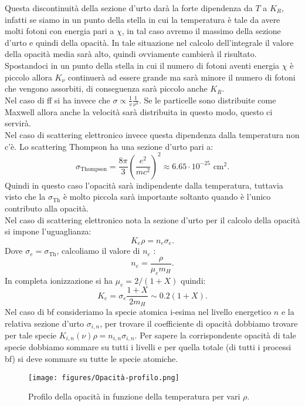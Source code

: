 Questa discontinuità della sezione d'urto darà la forte dipendenza da $T$ a $K_R$, infatti se siamo in un punto della stella in cui la temperatura è tale da avere molti fotoni con energia pari a $\chi$, in tal caso avremo il massimo della sezione d'urto e quindi della opacità. In tale situazione nel calcolo dell'integrale il valore della opacità media sarà alto, quindi ovviamente cambierà il risultato. \\
Spostandoci in un punto della stella in cui il numero di fotoni aventi energia $\chi$ è piccolo allora $K_\nu$ continuerà ad essere grande ma sarà minore il numero di fotoni che vengono assorbiti, di conseguenza sarà piccolo anche $K_R$.\\
Nel caso di ff si ha invece che $\sigma  \propto \frac{1}{\overline{v}} \frac{1}{\nu^3}$. Se le particelle sono distribuite come Maxwell allora anche la velocità sarà distribuita in questo modo, questo ci servirà.\\
Nel caso di scattering elettronico invece questa dipendenza dalla temperatura non c'è. Lo scattering Thompson ha una sezione d'urto pari a:
\[
\sigma_\text{Thompson} = 
\frac{8\pi}{3}\left(\frac{e^2}{mc^2}\right)^2 \approx 6.65 \cdot 10^{-25} \text{ cm}^2
.\] 
Quindi in questo caso l'opacità sarà indipendente dalla temperatura, tuttavia visto che la $\sigma_\text{Th} $ è molto piccola sarà importante soltanto quando è l'unico contributo alla opacità.\\
Nel caso di scattering elettronico nota la sezione d'urto per il calcolo della opacità si impone l'uguaglianza:
\[
K_e \rho  = n_e \sigma_e
.\] 
Dove $\sigma_e = \sigma_\text{Th}$, calcoliamo il valore di $n_e$ : 
\[
n_e = \frac{\rho}{\mu_e m_H}
.\] 
In completa ionizzazione si ha $\mu_e = 2 /(1+X) $ quindi:
\[
    K_e = \sigma_e \frac{1+X}{2 m_H} \sim 0.2 \left(1+X\right)
.\] 
Nel caso di bf consideriamo la specie atomica i-esima nel livello energetico $n$ e la relativa sezione d'urto $\sigma_{i,n}$, per trovare il coefficiente di opacità dobbiamo trovare per tale specie $K_{i,n}(\nu) \rho = n_{i,n} \sigma_{i,n}$. 
Per sapere la corrispondente opacità di tale specie dobbiamo sommare su tutti i livelli e per quella totale (di tutti i processi bf) si deve sommare su tutte le specie atomiche. 
\begin{figure}[H]
    \centering
    \texttt{[image: figures/Opacità-profilo.png]}
    \caption{Profilo della opacità in funzione della temperatura per vari $\rho$.}
    \label{fig:figures-Opacità-profilo-png}
\end{figure}
